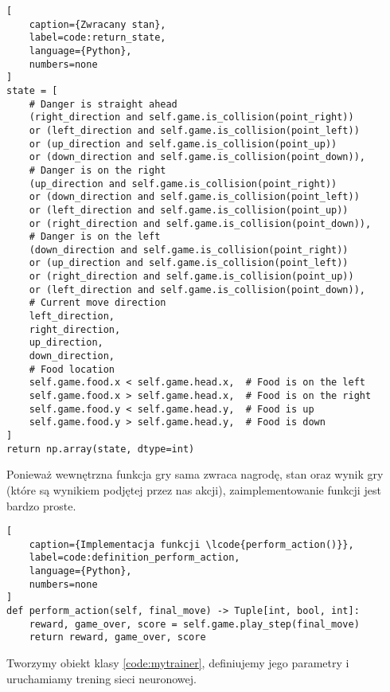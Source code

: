 \begin{onepage}
    \begin{lstlisting}[
    caption={Zwracany stan},
    label=code:return_state,
    language={Python},
    numbers=none
]
state = [
    # Danger is straight ahead
    (right_direction and self.game.is_collision(point_right))
    or (left_direction and self.game.is_collision(point_left))
    or (up_direction and self.game.is_collision(point_up))
    or (down_direction and self.game.is_collision(point_down)),
    # Danger is on the right
    (up_direction and self.game.is_collision(point_right))
    or (down_direction and self.game.is_collision(point_left))
    or (left_direction and self.game.is_collision(point_up))
    or (right_direction and self.game.is_collision(point_down)),
    # Danger is on the left
    (down_direction and self.game.is_collision(point_right))
    or (up_direction and self.game.is_collision(point_left))
    or (right_direction and self.game.is_collision(point_up))
    or (left_direction and self.game.is_collision(point_down)),
    # Current move direction
    left_direction,
    right_direction,
    up_direction,
    down_direction,
    # Food location
    self.game.food.x < self.game.head.x,  # Food is on the left
    self.game.food.x > self.game.head.x,  # Food is on the right
    self.game.food.y < self.game.head.y,  # Food is up
    self.game.food.y > self.game.head.y,  # Food is down
]
return np.array(state, dtype=int)
    \end{lstlisting}
\end{onepage}

\clearpage

Ponieważ wewnętrzna funkcja  gry sama zwraca nagrodę, stan oraz wynik gry (które są wynikiem podjętej przez nas akcji), zaimplementowanie funkcji  jest bardzo proste.


\begin{onepage}
    \begin{lstlisting}[
    caption={Implementacja funkcji \lcode{perform_action()}},
    label=code:definition_perform_action,
    language={Python},
    numbers=none
]
def perform_action(self, final_move) -> Tuple[int, bool, int]:
    reward, game_over, score = self.game.play_step(final_move)
    return reward, game_over, score
    \end{lstlisting}
\end{onepage}


Tworzymy obiekt klasy  \ref{code:mytrainer}, definiujemy jego parametry i uruchamiamy trening sieci neuronowej.

